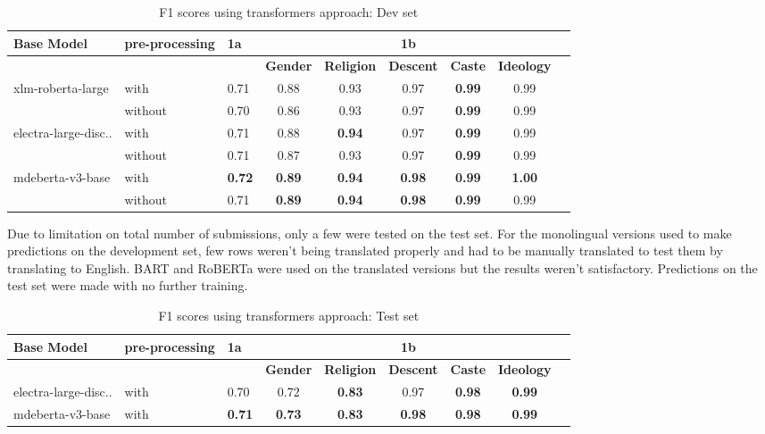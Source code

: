 \documentclass[10pt, a4paper]{article}
\begin{document}
\begin{table}[h!]
\begin{center}
\begin{tabular}{|l|l|l|c|c|c|c|c|c|}
\hline
\textbf{Base Model} & \textbf{pre-processing} & \textbf{1a} & \multicolumn{5}{c|}{\textbf{1b}} \\
\hline
& & & \textbf{Gender} & \textbf{Religion} & \textbf{Descent} & \textbf{Caste} & \textbf{Ideology} \\
\hline
xlm-roberta-large & with & 0.71 & 0.88 & 0.93 & 0.97 & \textbf{0.99} & 0.99 \\
 & without & 0.70 & 0.86 & 0.93 & 0.97 & \textbf{0.99} & 0.99 \\
\hline
electra-large-disc.. & with & 0.71 & 0.88 & \textbf{0.94} & 0.97 & \textbf{0.99} & 0.99 \\
 & without & 0.71 & 0.87 & 0.93 & 0.97 & \textbf{0.99} & 0.99 \\
\hline
mdeberta-v3-base & with & \textbf{0.72} & \textbf{0.89} & \textbf{0.94} & \textbf{0.98} & \textbf{0.99} & \textbf{1.00} \\
 & without & 0.71 & \textbf{0.89} & \textbf{0.94} & \textbf{0.98} & \textbf{0.99} & 0.99 \\
\hline
\end{tabular}
\caption{F1 scores using transformers approach: Dev set}
\label{table:4}
\end{center}
\end{table}

Due to limitation on total number of submissions, only a few were tested on the test set. For the monolingual versions used to make predictions on the development set, few rows weren't being translated properly and had to be manually translated to test them by translating to English. BART \citep{lewis2019bart} and RoBERTa \citep{liu2019roberta} were used on the translated versions but the results weren't satisfactory. Predictions on the test set were made with no further training.

\begin{table}[h!]
\begin{center}
\begin{tabular}{|l|l|l|c|c|c|c|c|c|}
\hline
\textbf{Base Model} & \textbf{pre-processing} & \textbf{1a} & \multicolumn{5}{c|}{\textbf{1b}} \\
\hline
& & & \textbf{Gender} & \textbf{Religion} & \textbf{Descent} & \textbf{Caste} & \textbf{Ideology} \\
\hline
electra-large-disc.. & with & 0.70 & 0.72 & \textbf{0.83} & 0.97 & \textbf{0.98} & \textbf{0.99} \\
\hline
mdeberta-v3-base & with & \textbf{0.71} & \textbf{0.73} & \textbf{0.83} & \textbf{0.98} & \textbf{0.98} & \textbf{0.99} \\
\hline
\end{tabular}
\caption{F1 scores using transformers approach: Test set}
\label{table:5}
\end{center}
\end{table}
\end{document}
